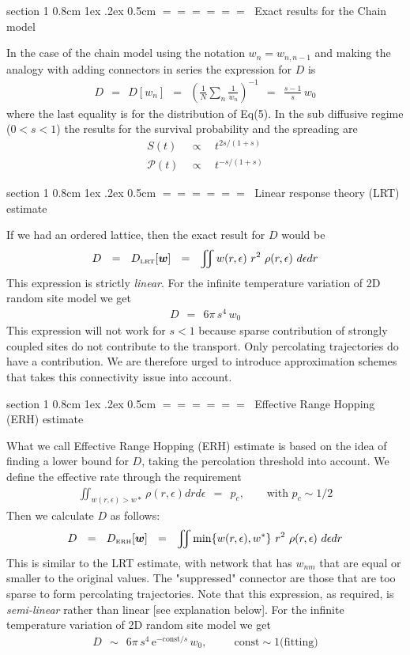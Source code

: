 \documentclass[onecolumn,fleqn,notitlepage,secnumarabic]{revtex4}
\makeatletter
\newcommand{\const}{\mbox{const}}
\newcommand{\eexp}{\mbox{e}^}
\newcommand{\tbox}[1]{\mbox{\tiny #1}}
\newcommand{\beq}{\begin{eqnarray}}
\newcommand{\eeq}{\end{eqnarray}}
\def\section{%
  \@startsection
    {section}%
    {1}%
    {\z@}%
    {0.8cm \@plus1ex \@minus .2ex}%
    {0.5cm}%
    {\Large\bf $=\!=\!=\!=\!=\!=\;$}%
}%
\makeatother
\begin{document}

\clearpage

\section{Exact results for the Chain model}

In the case of the chain model
using the notation $w_n=w_{n,n{-}1}$ 
and making the analogy with adding connectors in series 
the expression for $D$ is 
%
\beq
D \ \ = \ \ D[w_n] \ \ = \ \ \left( \frac{1}{N} \sum_n \frac{1}{w_n} \right)^{-1} 
\ \ = \ \ \frac{s-1}{s} \, w_0
\eeq
%
where the last equality is for the distribution of Eq(5).
In the sub diffusive regime (${0<s<1}$) the results 
for the survival probability and the spreading are 
%
\beq
S(t) \ \ &\propto& \ \ t^{2s/(1+s)}   \\ 
\mathcal{P}(t) \ \ &\propto& \ \ t^{-s/(1+s)}
\eeq

\section{Linear response theory (LRT) estimate}

If we had an ordered lattice, then the exact result for $D$ would be 
%
\beq
D \ \ = \ \ D_{\tbox{LRT}}[\bm{w}]  \ \ = \ \ \iint w(r,\epsilon) \ r^2  \ \rho(r,\epsilon) \ d\epsilon dr 
\eeq
%
This expression is strictly {\em linear}.
For the infinite temperature variation of 2D random site model we get  
%
\beq
D \ \ = \ \ 6\pi \, s^4 \, w_0
\eeq
%
This expression will not work for ${s<1}$ because sparse contribution 
of strongly coupled sites do not contribute to the transport. 
Only percolating trajectories do have a contribution. We are therefore urged 
to introduce approximation schemes that takes this connectivity 
issue into account.  
 

\section{Effective Range Hopping (ERH) estimate}

What we call Effective Range Hopping (ERH) estimate is based 
on the idea of finding a lower bound for $D$, taking the 
percolation threshold into account. We define the effective rate 
through the requirement 
%
\beq
\iint_{w(r,\epsilon)>w*} \rho(r,\epsilon)drd\epsilon \ \ = \ \ p_c, 
\ \ \ \ \ \ \ \ \ \mbox{with $p_c\sim 1/2$}
\eeq
%
Then we calculate $D$ as follows:
%
\beq
D \ \ = \ \ D_{\tbox{ERH}}[\bm{w}]  \ \ = \ \ \iint \min\{w(r,\epsilon),w^*\} \ r^2  \ \rho(r,\epsilon) \ d\epsilon dr
\eeq
%
This is similar to the LRT estimate, with network that has $w_{nm}$ 
that are equal or smaller to the original values. The "suppressed" 
connector are those that are too sparse to form percolating trajectories. 
Note that this expression, as required, is {\em semi-linear} 
rather than linear [see explanation below].
For the infinite temperature variation of 2D random site model we get  
%
\beq
D \ \ \sim \ \ 6\pi \, s^4 \, \eexp{-\const/s} \, w_0, 
\ \ \ \ \ \ \ \ \ \ \ \const\sim 1 \mbox{(fitting)} 
\eeq
\end{document}
